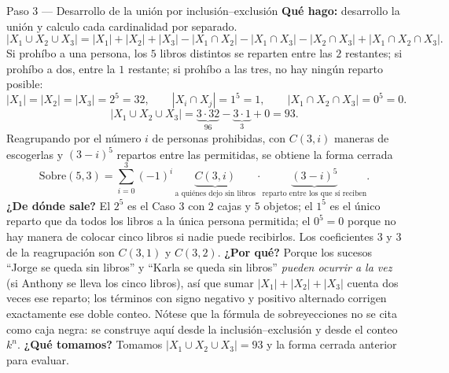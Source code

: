 \documentclass[11pt]{article}
\begin{document}
\begin{sol}
\begin{paso}{Paso 3 --- Desarrollo de la unión por inclusión--exclusión}
\textbf{Qué hago:} desarrollo la unión y calculo cada cardinalidad por separado.
\[
\bigl|X_1\cup X_2\cup X_3\bigr|=|X_1|+|X_2|+|X_3|-|X_1\cap X_2|-|X_1\cap X_3|-|X_2\cap X_3|+|X_1\cap X_2\cap X_3| .
\]
Si prohíbo a una persona, los $5$ libros distintos se reparten entre las $2$ restantes; si prohíbo a dos, entre la $1$ restante; si prohíbo a las tres, no hay ningún reparto posible:
\[
|X_1|=|X_2|=|X_3|=2^5=32,\qquad
|X_i\cap X_j|=1^5=1,\qquad
|X_1\cap X_2\cap X_3|=0^5=0 .
\]
\[
\bigl|X_1\cup X_2\cup X_3\bigr|=\underbrace{3\cdot 32}_{96}-\underbrace{3\cdot 1}_{3}+0=93 .
\]
Reagrupando por el número $i$ de personas prohibidas, con $C(3,i)$ maneras de escogerlas y $(3-i)^5$ repartos entre las permitidas, se obtiene la forma cerrada
\[
\text{Sobre}(5,3)=\sum_{i=0}^{3}(-1)^i\,\underbrace{C(3,i)}_{\text{a quiénes dejo sin libros}}\cdot\underbrace{(3-i)^{5}}_{\text{reparto entre los que sí reciben}} .
\]
\textbf{¿De dónde sale?} El $2^5$ es el Caso 3 con $2$ cajas y $5$ objetos; el $1^5$ es el único reparto que da todos los libros a la única persona permitida; el $0^5=0$ porque no hay manera de colocar cinco libros si nadie puede recibirlos. Los coeficientes $3$ y $3$ de la reagrupación son $C(3,1)$ y $C(3,2)$.
\textbf{¿Por qué?} Porque los sucesos ``Jorge se queda sin libros'' y ``Karla se queda sin libros'' \emph{pueden ocurrir a la vez} (si Anthony se lleva los cinco libros), así que sumar $|X_1|+|X_2|+|X_3|$ cuenta dos veces ese reparto; los términos con signo negativo y positivo alternado corrigen exactamente ese doble conteo. Nótese que la fórmula de sobreyecciones no se cita como caja negra: se construye aquí desde la inclusión--exclusión y desde el conteo $k^n$.
\textbf{¿Qué tomamos?} Tomamos $\bigl|X_1\cup X_2\cup X_3\bigr|=93$ y la forma cerrada anterior para evaluar.
\end{paso}


\end{sol}
\end{document}
